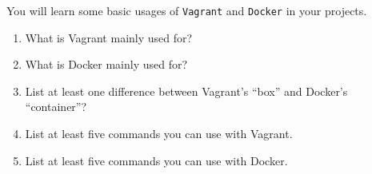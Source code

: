 \documentclass{report}
\begin{document}
\begin{problem}

You will learn some basic usages of \texttt{Vagrant} and \texttt{Docker} in your projects.

\begin{enumerate}
\item What is Vagrant mainly used for?
\item What is Docker mainly used for?
\item List at least one difference between Vagrant's ``box'' and Docker's
      ``container''?
\item List at least five commands you can use with Vagrant.
\item List at least five commands you can use with Docker.
\end{enumerate}


\end{problem}
\end{document}
